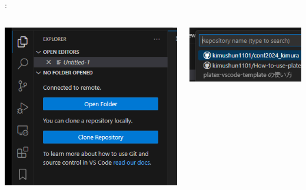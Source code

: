\documentclass[aspectratio=169,dvipdfmx,cjk]{beamer}
\begin{document}
\begin{frame}{\insertsection \thesubsection: \insertsubsection}
\begin{columns}
\begin{column}{0.3\textwidth}
      \includegraphics[width=1.0\linewidth]{fig/clone-gui.png}
    \end{column}
    \begin{column}{0.3\textwidth}
      \includegraphics[width=1.0\linewidth]{fig/select-repo.png}
    \end{column}
  \end{columns}
\end{frame}
\end{document}
